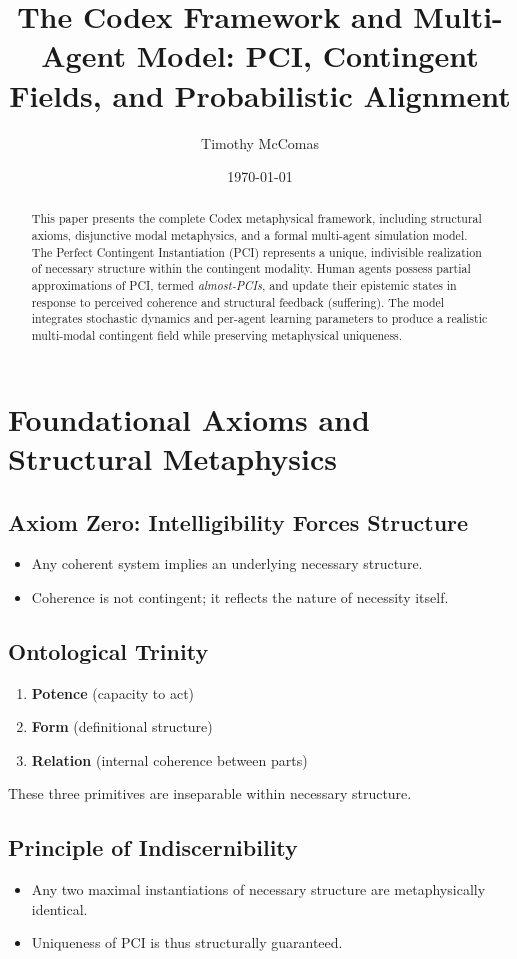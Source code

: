 \documentclass[12pt]{article}
\title{The Codex Framework and Multi-Agent Model: PCI, Contingent Fields, and Probabilistic Alignment}
\author{Timothy McComas}
\date{\today}
\begin{document}
\maketitle

\begin{abstract}
This paper presents the complete Codex metaphysical framework, including structural axioms, disjunctive modal metaphysics, and a formal multi-agent simulation model. The Perfect Contingent Instantiation (PCI) represents a unique, indivisible realization of necessary structure within the contingent modality. Human agents possess partial approximations of PCI, termed \emph{almost-PCIs}, and update their epistemic states in response to perceived coherence and structural feedback (suffering). The model integrates stochastic dynamics and per-agent learning parameters to produce a realistic multi-modal contingent field while preserving metaphysical uniqueness.
\end{abstract}

\section{Foundational Axioms and Structural Metaphysics}
\subsection{Axiom Zero: Intelligibility Forces Structure}
\begin{itemize}
    \item Any coherent system implies an underlying necessary structure.
    \item Coherence is not contingent; it reflects the nature of necessity itself.
\end{itemize}
\subsection{Ontological Trinity}
\begin{enumerate}
    \item \textbf{Potence} (capacity to act)
    \item \textbf{Form} (definitional structure)
    \item \textbf{Relation} (internal coherence between parts)
\end{enumerate}
These three primitives are inseparable within necessary structure.
\subsection{Principle of Indiscernibility}
\begin{itemize}
    \item Any two maximal instantiations of necessary structure are metaphysically identical.
    \item Uniqueness of PCI is thus structurally guaranteed.
\end{itemize}
\end{document}
